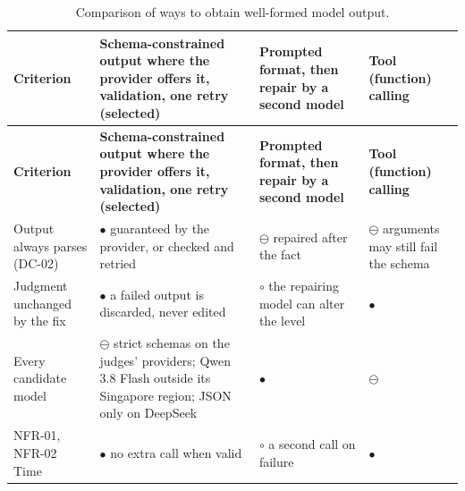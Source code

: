 {\small
\begin{longtable}{|>{\raggedright\arraybackslash}p{}|>{\raggedright\arraybackslash}p{}|>{\raggedright\arraybackslash}p{}|>{\raggedright\arraybackslash}p{}|}
\caption{Comparison of ways to obtain well-formed model output.} \\
\hline
\textbf{Criterion} & \textbf{Schema-\allowbreak{}constrained output where the provider offers it, validation, one retry (selected)} & \textbf{Prompted format, then repair by a second model} & \textbf{Tool (function) calling} \\ \hline
\endfirsthead
\hline
\textbf{Criterion} & \textbf{Schema-\allowbreak{}constrained output where the provider offers it, validation, one retry (selected)} & \textbf{Prompted format, then repair by a second model} & \textbf{Tool (function) calling} \\ \hline
\endhead
Output always parses (DC-02) & $\bullet$ guaranteed by the provider, or checked and retried & $\ominus$ repaired after the fact & $\ominus$ arguments may still fail the schema \\ \hline
Judgment unchanged by the fix & $\bullet$ a failed output is discarded, never edited & $\circ$ the repairing model can alter the level & $\bullet$ \\ \hline
Every candidate model & $\ominus$ strict schemas on the judges' providers; Qwen 3.8 Flash outside its Singapore region\cite{r200}; JSON only on DeepSeek\cite{r201} & $\bullet$ & $\ominus$ \\ \hline
NFR-01, NFR-02 Time & $\bullet$ no extra call when valid & $\circ$ a second call on failure & $\bullet$ \\ \hline
\end{longtable}
}

